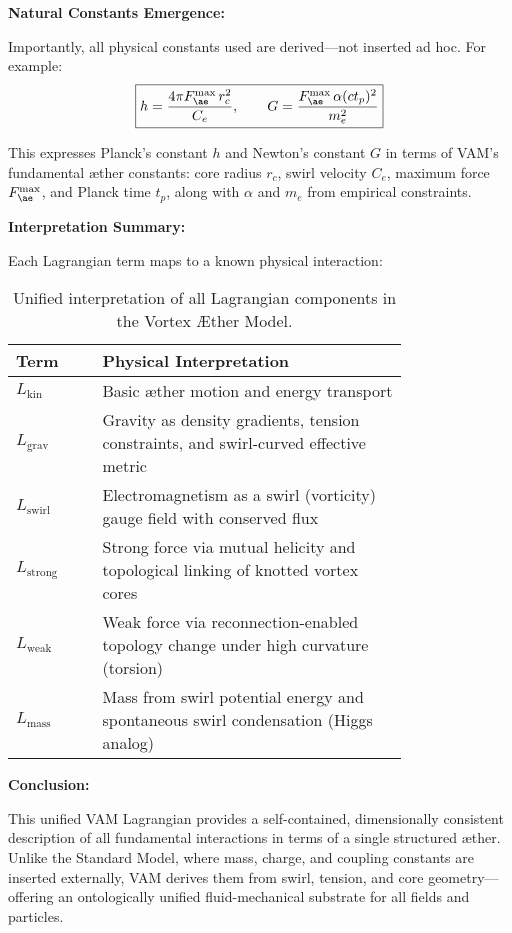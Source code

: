 \vspace{1em}
\noindent
\textbf{Natural Constants Emergence:}

Importantly, all physical constants used are derived—not inserted ad hoc. For example:
\[
\boxed{
h = \frac{4\pi F^{\max}_{\ae} \, r_c^2}{C_e}, \qquad
G = \frac{F^{\max}_{\ae} \, \alpha (ct_p)^2}{m_e^2}
}
\]

This expresses Planck’s constant \( h \) and Newton’s constant \( G \) in terms of VAM’s fundamental æther constants: core radius \( r_c \), swirl velocity \( C_e \), maximum force \( F^{\max}_{\ae} \), and Planck time \( t_p \), along with \( \alpha \) and \( m_e \) from empirical constraints.

\vspace{1em}
\noindent
\textbf{Interpretation Summary:}

Each Lagrangian term maps to a known physical interaction:

\begin{table}[H]
\centering
\renewcommand{\arraystretch}{1.2}
\begin{tabular}{|l|p{0.78\linewidth}|}
\hline
\textbf{Term} & \textbf{Physical Interpretation} \\
\hline
\( L_{\text{kin}} \) & Basic æther motion and energy transport \\
\( L_{\text{grav}} \) & Gravity as density gradients, tension constraints, and swirl-curved effective metric \\
\( L_{\text{swirl}} \) & Electromagnetism as a swirl (vorticity) gauge field with conserved flux \\
\( L_{\text{strong}} \) & Strong force via mutual helicity and topological linking of knotted vortex cores \\
\( L_{\text{weak}} \) & Weak force via reconnection-enabled topology change under high curvature (torsion) \\
\( L_{\text{mass}} \) & Mass from swirl potential energy and spontaneous swirl condensation (Higgs analog) \\
\hline
\end{tabular}
\caption{Unified interpretation of all Lagrangian components in the Vortex Æther Model.}
\end{table}

\vspace{1em}
\noindent
\textbf{Conclusion:}

This unified VAM Lagrangian provides a self-contained, dimensionally consistent description of all fundamental interactions in terms of a single structured æther. Unlike the Standard Model, where mass, charge, and coupling constants are inserted externally, VAM derives them from swirl, tension, and core geometry—offering an ontologically unified fluid-mechanical substrate for all fields and particles.
